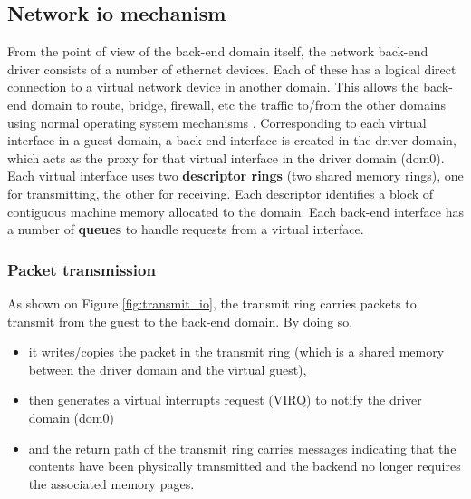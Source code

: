\subsection{Network \acrshort{io} mechanism}
From the point of view of the back-end domain itself, the network back-end driver consists of a number of ethernet devices. Each of these has a logical direct connection to a virtual network device in another domain. This allows the back-end domain to route, bridge, firewall, etc the traffic to/from the other domains using normal operating system mechanisms \citep{xen_book}. Corresponding to each virtual interface in a guest domain, a back-end interface is created in the driver domain, which acts as the proxy for that virtual interface in the driver domain (dom0). Each virtual interface uses two \textbf{descriptor rings} (two shared memory rings), one for transmitting, the other for receiving. Each descriptor identifies a block of contiguous machine memory allocated to the domain. Each back-end interface has a number of \textbf{queues} to handle requests from a virtual interface.

\subsubsection{Packet transmission}

As shown on Figure \ref{fig:transmit_io}, the transmit ring carries packets to transmit from the guest to the back-end domain. By doing so,

\begin{itemize}
    \item it writes/copies the packet in the transmit ring (which is a shared memory between the driver domain and the virtual guest),
    \item then generates a virtual \glspl{interrupt} request (VIRQ) to notify the driver domain (dom0)
    \item and the return path of the transmit ring carries messages indicating that the contents have been physically transmitted and the backend no longer requires the associated memory pages.
\end{itemize}

